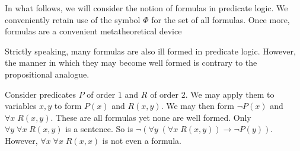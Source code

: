 \documentclass{amsbook}
\newcommand{\univ}[1]{\mathord\forall#1\;}
\newcommand{\then}{\mathrel\rightarrow}
\theoremstyle{definition}
\begin{document}
In what follows, we will consider the notion of formulas in predicate logic. We conveniently retain use of the symbol $\Phi$ for the set of all formulas. Once more, formulas are a convenient metatheoretical device

Strictly speaking, many formulas are also ill formed in predicate logic. However, the manner in which they may become well formed is contrary to the propositional analogue.

Consider predicates $P$ of order $1$ and $R$ of order $2$. We may apply them to variables $x, y$ to form $P(x)$ and $R(x,y)$. We may then form $\neg P(x)$ and $\univ x R(x, y)$. These are all formulas yet none are well formed. Only $\univ y \univ x R(x,y)$ is a sentence. So is $\neg(\univ y (\univ x R(x,y)) \then \neg P(y))$. However, $\univ x \univ x R(x, x)$ is not even a formula.
\end{document}
